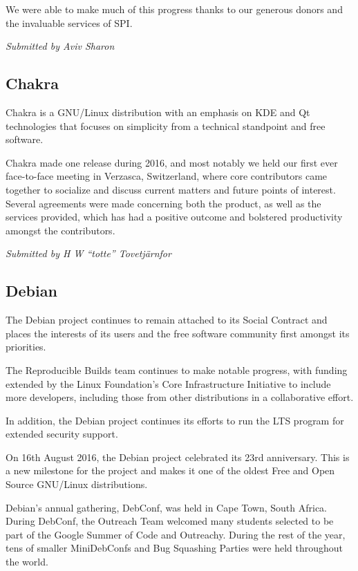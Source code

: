 \documentclass[letterpaper]{report}
\begin{document}
We were able to make much of this progress thanks to our generous donors
and the invaluable services of SPI.

{\em Submitted by Aviv Sharon}

\subsection{Chakra}

Chakra is a GNU/Linux distribution with an emphasis on KDE and Qt
technologies that focuses on simplicity from a technical standpoint and
free software.

Chakra made one release during 2016, and most notably we held our first
ever face-to-face meeting in Verzasca, Switzerland, where core
contributors came together to socialize and discuss current matters and
future points of interest. Several agreements were made concerning both
the product, as well as the services provided, which has had a positive
outcome and bolstered productivity amongst the contributors.

{\em Submitted by H W ``totte'' Tovetjärnfor}

\subsection{Debian}

The Debian project continues to remain attached to its Social Contract
and places the interests of its users and the free software community
first amongst its priorities.

The Reproducible Builds team continues to make notable progress, with
funding extended by the Linux Foundation's Core Infrastructure
Initiative to include more developers, including those from other
distributions in a collaborative effort.

In addition, the Debian project continues its efforts to run the LTS
program for extended security support.

On 16th August 2016, the Debian project celebrated its 23rd anniversary.
This is a new milestone for the project and makes it one of the oldest
Free and Open Source GNU/Linux distributions.

Debian's annual gathering, DebConf, was held in Cape Town, South Africa.
During DebConf, the Outreach Team welcomed many students selected to be
part of the Google Summer of Code and Outreachy. During the rest of the
year, tens of smaller MiniDebConfs and Bug Squashing Parties were held
throughout the world.
\end{document}
